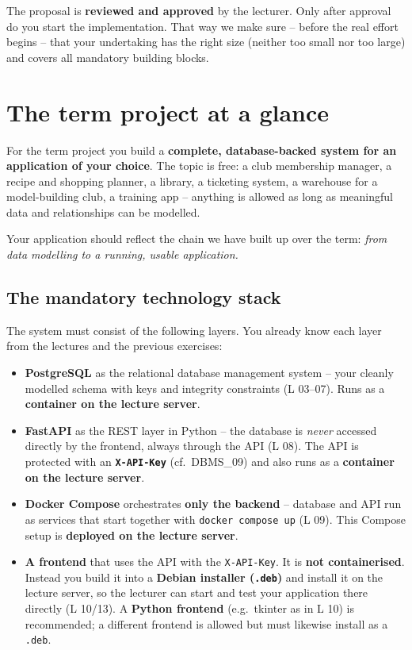\documentclass[11pt,a4paper]{article}
\begin{document}
The proposal is \textbf{reviewed and approved} by the lecturer. Only after
approval do you start the implementation. That way we make sure -- before the
real effort begins -- that your undertaking has the right size (neither too
small nor too large) and covers all mandatory building blocks.

\section{The term project at a glance}

For the term project you build a \textbf{complete, database-backed system for an
application of your choice}. The topic is free: a club membership manager, a
recipe and shopping planner, a library, a ticketing system, a warehouse for a
model-building club, a training app -- anything is allowed as long as
meaningful data and relationships can be modelled.

Your application should reflect the chain we have built up over the term:
\emph{from data modelling to a running, usable application.}

\subsection{The mandatory technology stack}

The system must consist of the following layers. You already know each layer
from the lectures and the previous exercises:

\begin{itemize}[leftmargin=1.4em]
  \item \textbf{PostgreSQL} as the relational database management system -- your
        cleanly modelled schema with keys and integrity constraints
        (L 03--07). Runs as a \textbf{container on the lecture server}.
  \item \textbf{FastAPI} as the REST layer in Python -- the database is
        \emph{never} accessed directly by the frontend, always through the API
        (L 08). The API is protected with an \textbf{\texttt{X-API-Key}}
        (cf.\ DBMS\_09) and also runs as a \textbf{container on the lecture
        server}.
  \item \textbf{Docker Compose} orchestrates \textbf{only the backend} --
        database and API run as services that start together with
        \texttt{docker compose up} (L 09). This Compose setup is
        \textbf{deployed on the lecture server}.
  \item \textbf{A frontend} that uses the API with the \texttt{X-API-Key}. It is
        \textbf{not containerised}. Instead you build it into a \textbf{Debian
        installer (\texttt{.deb})} and install it on the lecture server, so the
        lecturer can start and test your application there directly (L 10/13). A
        \textbf{Python frontend} (e.g.\ tkinter as in L 10) is recommended; a
        different frontend is allowed but must likewise install as a
        \texttt{.deb}.
\end{itemize}
\end{document}
